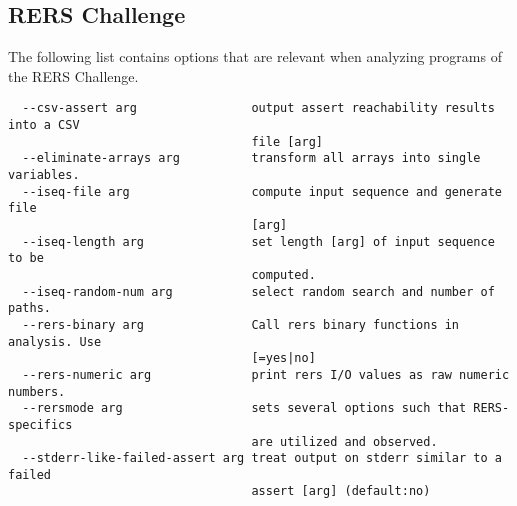 \documentclass[natbib]{article}
\begin{document}
\subsection{RERS Challenge}
The following list contains options that are relevant when analyzing programs of the RERS Challenge.
\begin{verbatim}
  --csv-assert arg                output assert reachability results into a CSV
                                  file [arg]
  --eliminate-arrays arg          transform all arrays into single variables.
  --iseq-file arg                 compute input sequence and generate file 
                                  [arg]
  --iseq-length arg               set length [arg] of input sequence to be 
                                  computed.
  --iseq-random-num arg           select random search and number of paths.
  --rers-binary arg               Call rers binary functions in analysis. Use 
                                  [=yes|no]
  --rers-numeric arg              print rers I/O values as raw numeric numbers.
  --rersmode arg                  sets several options such that RERS-specifics
                                  are utilized and observed.
  --stderr-like-failed-assert arg treat output on stderr similar to a failed 
                                  assert [arg] (default:no)
\end{verbatim}
\end{document}
